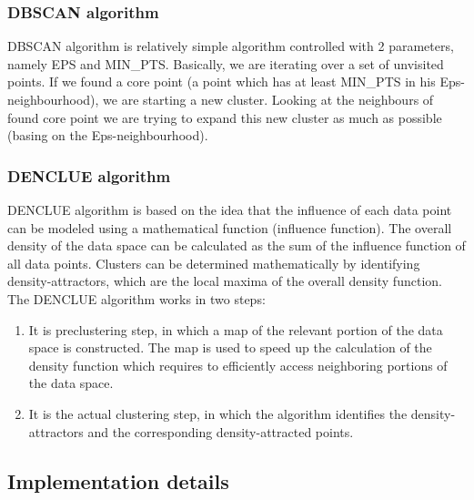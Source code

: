 \documentclass[12pt, a4paper, notitlepage, oneside]{article}
\begin{document}
\subsubsection*{DBSCAN algorithm}

DBSCAN algorithm is relatively simple algorithm controlled with 2 parameters, namely EPS and MIN\_PTS. \cite{dbscan}
Basically, we are iterating over a set of unvisited points. If we found a core point (a point which has
at least MIN\_PTS in his Eps-neighbourhood), we are starting a new cluster. Looking at the neighbours 
of found core point we are trying to expand this new cluster as much as possible (basing on the Eps-neighbourhood).


\subsubsection*{DENCLUE algorithm}

DENCLUE algorithm is based on the idea that the influence of each data point can be modeled using a mathematical 
function (influence function). \cite{denclue} The overall density of the data space can be calculated as the sum of the influence 
function of all data points. Clusters can be determined mathematically by identifying density-attractors, 
which are the local maxima of the overall density function. The DENCLUE algorithm works in two steps:

\begin{enumerate}
	\item It is preclustering step, in which a map of the relevant portion of the data space is constructed. The map is used to speed up the calculation of the density function which requires to efficiently access neighboring portions of the data space. 
	\item It is the actual clustering step, in which the algorithm identifies the density-attractors and the corresponding density-attracted points.
\end{enumerate}

\subsection*{Implementation details}
\end{document}
